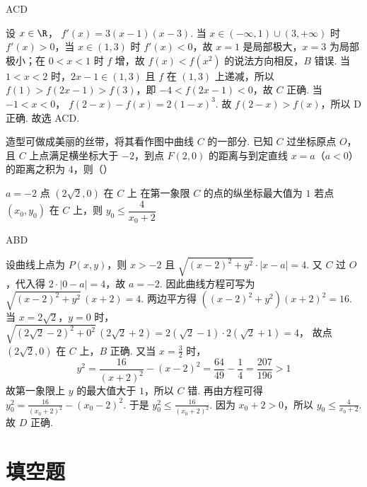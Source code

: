\begin{answer}
ACD
\end{answer}

\begin{solution}
设 \(x\in\R\)，
\(f'(x)=3(x-1)(x-3)\).
当 \(x\in(-\infty,1)\cup(3,+\infty)\) 时 \(f'(x)>0\)，当 \(x\in(1,3)\) 时 \(f'(x)<0\)，故 \(x=1\) 是局部极大，\(x=3\) 为局部极小；在 \(0<x<1\) 时 \(f\) 增，故 \(f(x)<f(x^2)\) 的说法方向相反，\(B\) 错误.
当 \(1<x<2\) 时，\(2x-1\in(1,3)\) 且 \(f\) 在 \((1,3)\) 上递减，所以 \(f(1)>f(2x-1)>f(3)\)，即 \(-4<f(2x-1)<0\)，故 \(C\) 正确.
当 \(-1<x<0\)，
\(f(2-x)-f(x)=2(1-x)^3\).
故 \(f(2-x)>f(x)\)，所以 D 正确. 故选 ACD.
\end{solution}

\begin{problem}
造型可做成美丽的丝带，将其看作图中曲线 \(C\) 的一部分. 已知 \(C\) 过坐标原点 \(O\)，且 \(C\) 上点满足横坐标大于 \(-2\)，到点 \(F(2,0)\) 的距离与到定直线 \(x=a\)（\(a<0\)） 的距离之积为 \(4\)，则（\quad）


\choices
    {\(a=-2\)}
    {点 \((2\sqrt2,0)\) 在 \(C\) 上}
    {在第一象限 \(C\) 的点的纵坐标最大值为 \(1\)}
    {若点 \((x_0,y_0)\) 在 \(C\) 上，则 \(y_0\le \dfrac{4}{x_0+2}\)}
\end{problem}

\begin{answer}
ABD
\end{answer}

\begin{solution}
设曲线上点为 \(P(x,y)\)，则 \(x>-2\) 且
\(\sqrt{(x-2)^2+y^2}\cdot |x-a|=4\).
又 \(C\) 过 \(O\)，代入得 \(2\cdot|0-a|=4\)，故 \(a=-2\).
因此曲线方程可写为
\(\sqrt{(x-2)^2+y^2}\,(x+2)=4\).
两边平方得
\(\left((x-2)^2+y^2\right)(x+2)^2=16\).
当 \(x=2\sqrt2\)，\(y=0\) 时，
\(\sqrt{(2\sqrt2-2)^2+0^2}\,(2\sqrt2+2)=2(\sqrt2-1)\cdot 2(\sqrt2+1)=4\)，
故点 \((2\sqrt2,0)\) 在 \(C\) 上，\(B\) 正确.
又当 \(x=\frac32\) 时，
\[
y^2=\frac{16}{(x+2)^2}-(x-2)^2=\frac{64}{49}-\frac14=\frac{207}{196}>1
\]
故第一象限上 \(y\) 的最大值大于 \(1\)，所以 \(C\) 错.
再由方程可得
\(y_0^2=\frac{16}{(x_0+2)^2}-(x_0-2)^2\).
于是
\(y_0^2\le \frac{16}{(x_0+2)^2}\).
因为 \(x_0+2>0\)，所以
\(y_0\le \frac{4}{x_0+2}\).
故 \(D\) 正确.
\end{solution}
\section{填空题}


